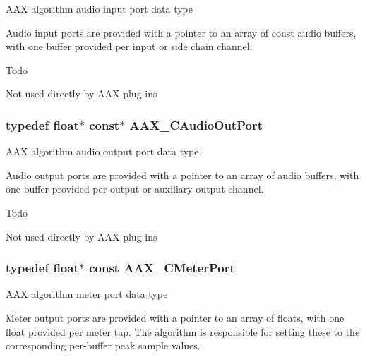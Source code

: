 A\+A\+X algorithm audio input port data type 

Audio input ports are provided with a pointer to an array of const audio buffers, with one buffer provided per input or side chain channel.

\begin{DoxyRefDesc}{Todo}
\item[\hyperlink{a00382__todo000009}{Todo}]Not used directly by A\+A\+X plug-\/ins \end{DoxyRefDesc}
\hypertarget{a00149_a650727644637144afc13344e7996c947}{}
\subsubsection[{A\+A\+X\+\_\+\+C\+Audio\+Out\+Port}]{\setlength{\rightskip}{0pt plus 5cm}typedef float$\ast$ const$\ast$ {\bf A\+A\+X\+\_\+\+C\+Audio\+Out\+Port}}\label{a00149_a650727644637144afc13344e7996c947}


A\+A\+X algorithm audio output port data type 

Audio output ports are provided with a pointer to an array of audio buffers, with one buffer provided per output or auxiliary output channel.

\begin{DoxyRefDesc}{Todo}
\item[\hyperlink{a00382__todo000010}{Todo}]Not used directly by A\+A\+X plug-\/ins \end{DoxyRefDesc}
\hypertarget{a00149_aa6f40c5c3f36ede060fca61535ea8464}{}
\subsubsection[{A\+A\+X\+\_\+\+C\+Meter\+Port}]{\setlength{\rightskip}{0pt plus 5cm}typedef float$\ast$ const {\bf A\+A\+X\+\_\+\+C\+Meter\+Port}}\label{a00149_aa6f40c5c3f36ede060fca61535ea8464}


A\+A\+X algorithm meter port data type 

Meter output ports are provided with a pointer to an array of floats, with one float provided per meter tap. The algorithm is responsible for setting these to the corresponding per-\/buffer peak sample values.

